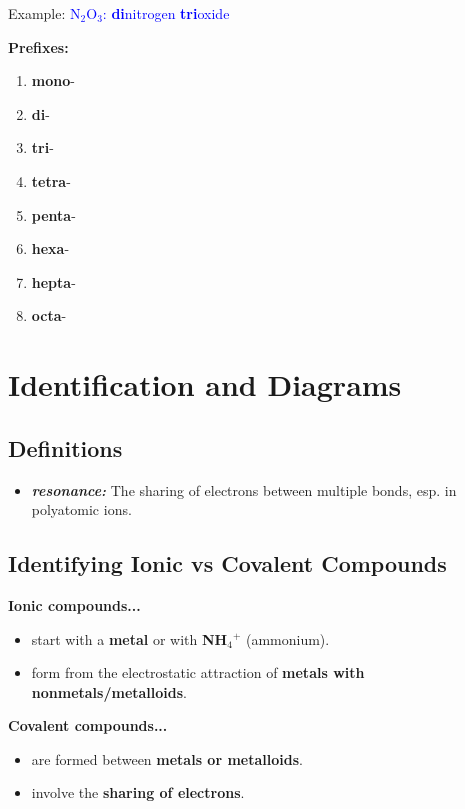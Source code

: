 \documentclass[a4paper, 12pt]{article}
\begin{document}
Example: \textcolor{blue}{N$_2$O$_3$: \textbf{di}nitrogen \textbf{tri}oxide}

\textbf{Prefixes:}
\begin{enumerate}[leftmargin=*,nosep]
    \item \textbf{mono}-
    \item \textbf{di}-
    \item \textbf{tri}-
    \item \textbf{tetra}-
    \item \textbf{penta}-
    \item \textbf{hexa}-
    \item \textbf{hepta}-
    \item \textbf{octa}-
\end{enumerate}

\section{Identification and Diagrams}

\subsection{Definitions}

\begin{itemize}[leftmargin=*, nosep]
\item \textbf{\textit{resonance:}} The sharing of electrons between multiple bonds, esp. in polyatomic ions.
\end{itemize}

\subsection{Identifying Ionic vs Covalent Compounds}

\textbf{Ionic compounds...}
\begin{itemize}[leftmargin=*,nosep]
    \item start with a \textbf{metal} or with \textbf{NH$_4$$^+$} (ammonium).
    \item form from the electrostatic attraction of \textbf{metals with nonmetals/metalloids}.
\end{itemize}

\textbf{Covalent compounds...}
\begin{itemize}[leftmargin=*,nosep]
    \item are formed between \textbf{metals or metalloids}.
    \item involve the \textbf{sharing of electrons}.
\end{itemize}
\end{document}
